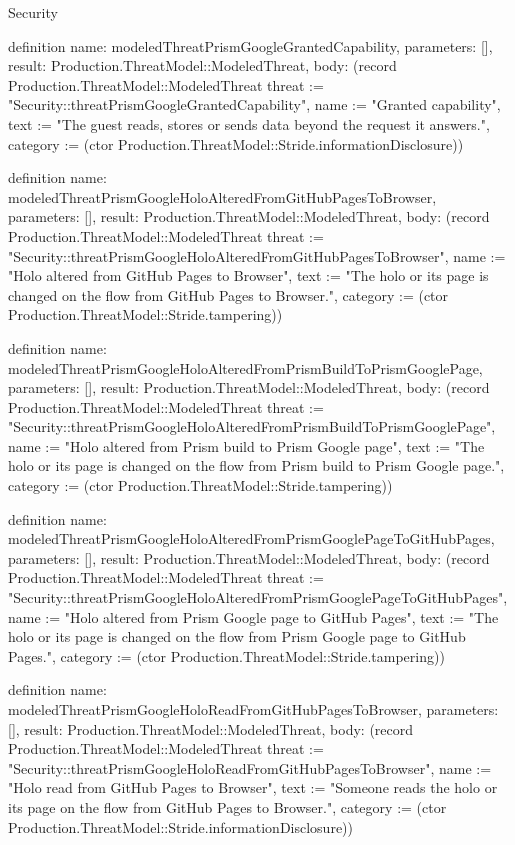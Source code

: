 \begin{lexlean}{Security}
\begin{semanticmodule}
definition{
  name: modeledThreatPrismGoogleGrantedCapability,
  parameters: [],
  result: Production.ThreatModel::ModeledThreat,
  body: (record Production.ThreatModel::ModeledThreat {threat := "Security::threatPrismGoogleGrantedCapability", name := "Granted capability", text := "The guest reads, stores or sends data beyond the request it answers.", category := (ctor Production.ThreatModel::Stride.informationDisclosure)})
}

definition{
  name: modeledThreatPrismGoogleHoloAlteredFromGitHubPagesToBrowser,
  parameters: [],
  result: Production.ThreatModel::ModeledThreat,
  body: (record Production.ThreatModel::ModeledThreat {threat := "Security::threatPrismGoogleHoloAlteredFromGitHubPagesToBrowser", name := "Holo altered from GitHub Pages to Browser", text := "The holo or its page is changed on the flow from GitHub Pages to Browser.", category := (ctor Production.ThreatModel::Stride.tampering)})
}

definition{
  name: modeledThreatPrismGoogleHoloAlteredFromPrismBuildToPrismGooglePage,
  parameters: [],
  result: Production.ThreatModel::ModeledThreat,
  body: (record Production.ThreatModel::ModeledThreat {threat := "Security::threatPrismGoogleHoloAlteredFromPrismBuildToPrismGooglePage", name := "Holo altered from Prism build to Prism Google page", text := "The holo or its page is changed on the flow from Prism build to Prism Google page.", category := (ctor Production.ThreatModel::Stride.tampering)})
}

definition{
  name: modeledThreatPrismGoogleHoloAlteredFromPrismGooglePageToGitHubPages,
  parameters: [],
  result: Production.ThreatModel::ModeledThreat,
  body: (record Production.ThreatModel::ModeledThreat {threat := "Security::threatPrismGoogleHoloAlteredFromPrismGooglePageToGitHubPages", name := "Holo altered from Prism Google page to GitHub Pages", text := "The holo or its page is changed on the flow from Prism Google page to GitHub Pages.", category := (ctor Production.ThreatModel::Stride.tampering)})
}

definition{
  name: modeledThreatPrismGoogleHoloReadFromGitHubPagesToBrowser,
  parameters: [],
  result: Production.ThreatModel::ModeledThreat,
  body: (record Production.ThreatModel::ModeledThreat {threat := "Security::threatPrismGoogleHoloReadFromGitHubPagesToBrowser", name := "Holo read from GitHub Pages to Browser", text := "Someone reads the holo or its page on the flow from GitHub Pages to Browser.", category := (ctor Production.ThreatModel::Stride.informationDisclosure)})
}


\end{semanticmodule}
\end{lexlean}
